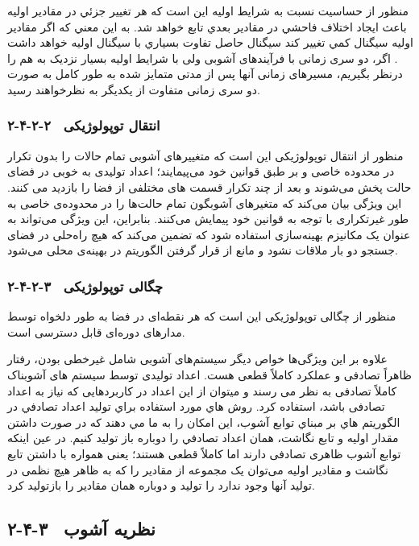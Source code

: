 منظور از حساسيت نسبت به شرايط اوليه  اين است كه هر تغیير جزئي در مقادير اوليه باعث ايجاد اختلاف فاحشي در مقادير بعدي تابع خواهد شد.  به اين معني كه اگر مقادير اوليه سيگنال كمي تغيير كند سيگنال حاصل تفاوت بسياري با سيگنال اوليه خواهد داشت . اگر، دو سری زمانی با فرآیندهای آشوبی ولی با شرایط اولیه بسیار نزدیک به هم را درنظر بگیریم، مسیرهای زمانی آنها پس از مدتی متمایز شده به طور کامل به صورت دو سری زمانی متفاوت از یکدیگر به نظرخواهند رسید.

\subsubsection{۲-۴-۲-۲  انتقال توپولوژیکی}

منظور از انتقال توپولوژیکی  این است که متغییرهای آشوبی تمام حالات را بدون تکرار در محدوده خاصی و بر طبق قوانین خود می‌پیمایند؛ اعداد تولیدی به خوبی در فضای حالت پخش می‌شوند و بعد از چند تکرار قسمت های مختلفی از فضا را بازدید می کنند. این ویژگی بیان می‌کند که متغیرهای آشوبگون تمام حالت‌ها را در محدوده‌ی خاصی به طور غیرتکراری با توجه به قوانین خود پیمایش می‌کنند. بنابراین، این ویژگی می‌تواند به عنوان یک مکانیزم بهینه‌سازی استفاده شود که تضمین می‌کند که هیچ راه‌حلی در فضای جستجو دو بار ملاقات نشود و مانع از قرار گرفتن الگوریتم در بهینه‌ی محلی می‌شود.

\subsubsection{۲-۴-۲-۳  چگالی توپولوژیکی}

منظور از چگالی توپولوژیکی  این است که هر نقطه‌ای در فضا به طور دلخواه توسط مدارهای دوره‌ای  قابل دسترسی است.

علاوه بر این ویژگی‌ها خواص دیگر سیستم‌های آشوبی شامل غیرخطی بودن، رفتار ظاهراً تصادفی و عملکرد کاملاً قطعی هست. اعداد تولیدی توسط سیستم های آشوبناک کاملاً تصادفی به نظر می رسند و میتوان از این اعداد در کاربردهایی که نیاز به اعداد تصادفی  باشد، استفاده کرد. روش هاي مورد استفاده براي توليد اعداد تصادفي در الگوريتم هاي بر مبناي توابع آشوب، اين امكان را به ما مي دهند كه در صورت داشتن مقدار اوليه و تابع نگاشت، همان اعداد تصادفي را دوباره باز توليد كنيم. در عین اینکه توابع آشوب ظاهری تصادفی دارند اما کاملاً قطعی هستند؛ یعنی همواره با داشتن تابع نگاشت و مقادیر اولیه می‌توان یک مجموعه از مقادیر را که به ظاهر هیچ نظمی در تولید آنها وجود ندارد را تولید و دوباره همان مقادیر را بازتولید کرد.

\subsection{۲-۴-۳  نظریه آشوب}

